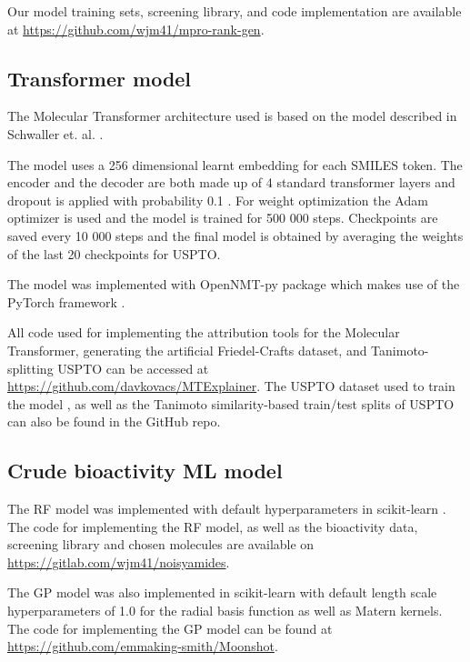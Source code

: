Our model training sets, screening library, and code implementation are available at \url{https://github.com/wjm41/mpro-rank-gen}. \cite{howard2018fastai}

\subsection{Transformer model} \label{appendix:transformer}
The Molecular Transformer architecture used is based on the model described in Schwaller et. al. \cite{Schwaller2019MolecularPrediction}.

The model uses a 256 dimensional learnt embedding for each SMILES token. The encoder and the decoder are both made up of 4 standard transformer layers and dropout is applied with probability 0.1 \cite{Srivastava2014dropout}. For weight optimization the Adam optimizer is used and the model is trained for 500 000 steps. Checkpoints are saved every 10 000 steps and the final model is obtained by averaging the weights of the last 20 checkpoints for USPTO.

The model was implemented with OpenNMT-py package \cite{Klein2017} which makes use of the PyTorch framework \cite{paszke2019pytorch}.

All code used for implementing the attribution tools for the Molecular Transformer, generating the artificial Friedel-Crafts dataset, and Tanimoto-splitting USPTO can be accessed at \url{https://github.com/davkovacs/MTExplainer}. The USPTO dataset used to train the model \cite{Lowe2012, Jin2017}, as well as the Tanimoto similarity-based train/test splits of USPTO can also be found in the GitHub repo.

\subsection{Crude bioactivity ML model} \label{appendix:crude}
The RF model was implemented with default hyperparameters in scikit-learn \cite{scikit-learn}. The code for implementing the RF model, as well as the bioactivity data, screening library and chosen molecules are available on \url{https://gitlab.com/wjm41/noisyamides}.

The GP model was also implemented in scikit-learn \cite{scikit-learn} with default length scale hyperparameters of 1.0 for the radial basis function as well as Matern kernels. The code for implementing the GP model can be found at \url{https://github.com/emmaking-smith/Moonshot}.